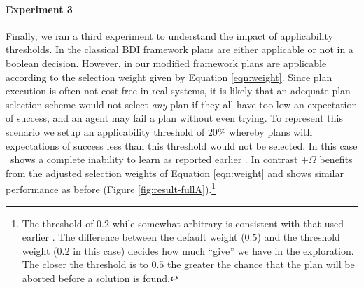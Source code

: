\paragraph{Experiment 3} Finally, we ran a third experiment to understand the impact of applicability thresholds. In the classical BDI framework plans are either applicable or not in a boolean decision. However, in our modified framework plans are applicable according to the selection weight given by Equation \ref{eqn:weight}. Since plan execution is often not cost-free in real systems, it is likely that an adequate plan selection scheme would not select \textit{any} plan if they all have too low an expectation of success, and an agent may fail a plan without even trying. To represent this scenario we setup an applicability threshold of $20\%$ whereby plans with expectations of success less than this threshold would not be selected. In this case \CL\ shows a complete inability to learn as reported earlier \cite{Singh:AAMAS10}. In contrast \CL+$\Omega$ benefits from the adjusted selection weights of Equation \ref{eqn:weight} and shows similar performance as before (Figure \ref{fig:result-fullA}).\footnote{The threshold of $0.2$ while somewhat arbitrary is consistent with that used earlier \cite{Singh:AAMAS10}. The difference between the default weight ($0.5$) and the threshold weight ($0.2$ in this case) decides how much ``give'' we have in the exploration. The closer the threshold is to $0.5$ the greater the chance that the plan will be aborted before a solution is found.}


